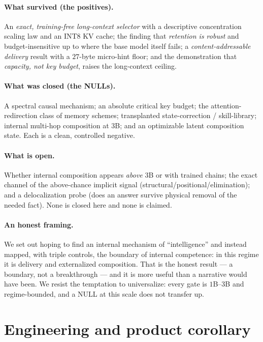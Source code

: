 \documentclass[11pt]{article}
\begin{document}
\paragraph{What survived (the positives).} An \emph{exact, training-free long-context
selector} with a descriptive concentration scaling law and an INT8 KV cache; the finding
that \emph{retention is robust} and budget-insensitive up to where the base model itself
fails; a \emph{content-addressable delivery} result with a $27$-byte micro-hint floor; and
the demonstration that \emph{capacity, not key budget}, raises the long-context ceiling.

\paragraph{What was closed (the NULLs).} A spectral causal mechanism; an absolute
critical key budget; the attention-redirection class of memory schemes; transplanted
state-correction / skill-library; internal multi-hop composition at $3$B; and an
optimizable latent composition state. Each is a clean, controlled negative.

\paragraph{What is open.} Whether internal composition appears \emph{above} $3$B or with
trained chains; the exact channel of the above-chance implicit signal
(structural/positional/elimination); and a delocalization probe (does an answer survive
physical removal of the needed fact). None is closed here and none is claimed.

\paragraph{An honest framing.} We set out hoping to find an internal mechanism of
``intelligence'' and instead mapped, with triple controls, the boundary of internal
competence: in this regime it is delivery and externalized composition. That is the
honest result --- a boundary, not a breakthrough --- and it is more useful than a
narrative would have been. We resist the temptation to universalize: every gate is
$1$B--$3$B and regime-bounded, and a NULL at this scale does not transfer up.

\section{Engineering and product corollary}
\label{sec:product}
\end{document}
